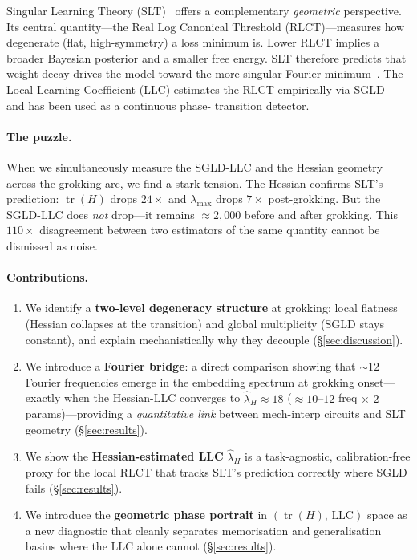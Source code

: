 \documentclass[12pt]{article}
\begin{document}
Singular Learning Theory (SLT)~\citep{watanabe2009algebraic} offers a
complementary \emph{geometric} perspective.  Its central quantity—the Real
Log Canonical Threshold (RLCT)—measures how degenerate (flat, high-symmetry)
a loss minimum is.  Lower RLCT implies a broader Bayesian posterior and a
smaller free energy.  SLT therefore predicts that weight decay drives the
model toward the more singular Fourier minimum~\citep{hoogland2024developmental}.
The Local Learning Coefficient (LLC) estimates the RLCT empirically via
SGLD~\citep{lau2023quantifying} and has been used as a continuous phase-
transition detector.

\paragraph{The puzzle.}
When we simultaneously measure the SGLD-LLC and the Hessian geometry across
the grokking arc, we find a stark tension.  The Hessian confirms SLT's
prediction: $\operatorname{tr}(H)$ drops $24\times$ and $\lambda_{\max}$ drops
$7\times$ post-grokking.  But the SGLD-LLC does \emph{not} drop—it remains
$\approx\!2{,}000$ before and after grokking.  This $110\times$ disagreement
between two estimators of the same quantity cannot be dismissed as noise.

\paragraph{Contributions.}
\begin{enumerate}
\item We identify a \textbf{two-level degeneracy structure} at grokking: local
  flatness (Hessian collapses at the transition) and global multiplicity
  (SGLD stays constant), and explain mechanistically why they decouple
  (\S\ref{sec:discussion}).
\item We introduce a \textbf{Fourier bridge}: a direct comparison showing that
  $\sim\!12$ Fourier frequencies emerge in the embedding spectrum at grokking
  onset—exactly when the Hessian-LLC converges to $\hat\lambda_H \approx 18$
  ($\approx\!10$--$12$ freq $\times$ $2$ params)—providing
  a \emph{quantitative link} between mech-interp circuits and SLT geometry
  (\S\ref{sec:results}).
\item We show the \textbf{Hessian-estimated LLC} $\hat\lambda_H$ is a
  task-agnostic, calibration-free proxy for the local RLCT that tracks SLT's
  prediction correctly where SGLD fails (\S\ref{sec:results}).
\item We introduce the \textbf{geometric phase portrait} in
  $(\operatorname{tr}(H),\,\text{LLC})$ space as a new diagnostic that cleanly
  separates memorisation and generalisation basins where the LLC alone cannot
  (\S\ref{sec:results}).
\end{enumerate}
\end{document}
